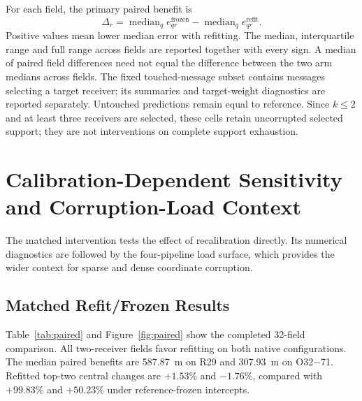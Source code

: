 \documentclass[11pt,a4paper]{article}
\newcommand{\med}{\operatorname{median}}
\begin{document}
For each field, the primary paired benefit is
\begin{equation}
 \Delta_r=\med_q e^{\mathrm{frozen}}_{qr}-\med_q e^{\mathrm{refit}}_{qr}.
\label{eq:pair}
\end{equation}
Positive values mean lower median error with refitting. The median, interquartile range and full range across fields are reported together with every sign. A median of paired field differences need not equal the difference between the two arm medians across fields. The fixed touched-message subset contains messages selecting a target receiver; its summaries and target-weight diagnostics are reported separately. Untouched predictions remain equal to reference. Since $k\leq2$ and at least three receivers are selected, these cells retain uncorrupted selected support; they are not interventions on complete support exhaustion.

\section{Calibration-Dependent Sensitivity and Corruption-Load Context}\label{sec:loadcal}
The matched intervention tests the effect of recalibration directly. Its numerical diagnostics are followed by the four-pipeline load surface, which provides the wider context for sparse and dense coordinate corruption.

\subsection{Matched Refit/Frozen Results}\label{sec:pairedresults}
Table~\ref{tab:paired} and Figure~\ref{fig:paired} show the completed 32-field comparison. All two-receiver fields favor refitting on both native configurations. The median paired benefits are 587.87~m on R29 and 307.93~m on O32$-$71. Refitted top-two central changes are $+1.53\%$ and $-1.76\%$, compared with $+99.83\%$ and $+50.23\%$ under reference-frozen intercepts.
\end{document}
